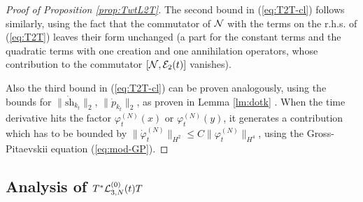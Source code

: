 \documentclass[11pt,a4paper]{article}
\newcommand{\cE}{{\cal E}}
\newcommand{\cL}{{\cal L}}
\newcommand{\cN}{{\cal N}}
\begin{document}
\begin{proof}[Proof of Proposition \ref{prop:TwtL2T}]
The second bound in (\ref{eq:T2T-cl}) follows similarly, using the fact that the commutator of $\cN$ with the terms on the r.h.s. of (\ref{eq:T2T}) leaves their form unchanged (a part for the constant terms and the quadratic terms with one creation and one annihilation operators, whose contribution to the commutator $[\cN , \cE_2 (t)]$ vanishes).  

Also the third bound in (\ref{eq:T2T-cl}) can be proven analogously, using
the bounds for $\| \dot{\text{sh}}_{k_t} \|_2$, $\| \dot{p}_{k_t} \|_2$, as proven in Lemma \ref{lm:dotk} . When the time derivative hits the factor $\varphi_t^{(N)} (x)$ or $\varphi_t^{(N)} (y)$, it generates a contribution which has to be bounded by $\| \dot\varphi_t^{(N)} \|_{H^2} \leq C \| \varphi_t^{(N)} \|_{H^4}$, using the Gross-Pitaevskii equation (\ref{eq:mod-GP}). 
\end{proof}

\subsection{Analysis of $T^* \cL^{(0)}_{3,N} (t) T$}
\end{document}
